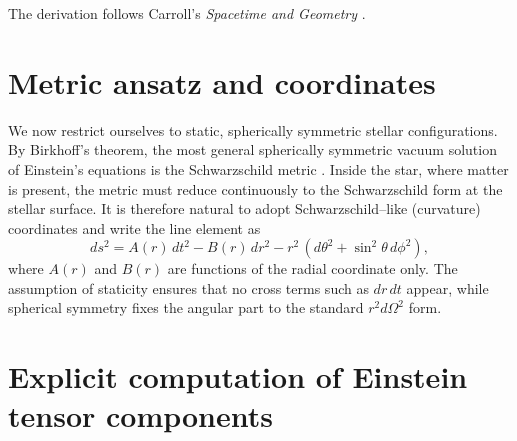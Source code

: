The derivation follows Carroll’s \emph{Spacetime and Geometry} \cite{oppenheimer1939, tolman1939, carroll}.

\section{Metric ansatz and coordinates}
We now restrict ourselves to static, spherically symmetric stellar configurations. 
By Birkhoff’s theorem, the most general spherically symmetric vacuum solution of 
Einstein’s equations is the Schwarzschild metric \cite{carroll}. Inside the star, where matter is present, 
the metric must reduce continuously to the Schwarzschild form at the stellar surface. 
It is therefore natural to adopt Schwarzschild–like (curvature) coordinates and write the 
line element as
\begin{equation}
ds^{2} = A(r)\, dt^{2} - B(r)\, dr^{2} - r^{2}\,(d\theta^{2}+\sin^{2}\theta\, d\phi^{2}),
\label{eq:metric_ansatz}
\end{equation}
where $A(r)$ and $B(r)$ are functions of the radial coordinate only. 
The assumption of staticity ensures that no cross terms such as $dr\,dt$ appear, 
while spherical symmetry fixes the angular part to the standard 
$r^{2} d\Omega^{2}$ form.

\section{Explicit computation of Einstein tensor components}

